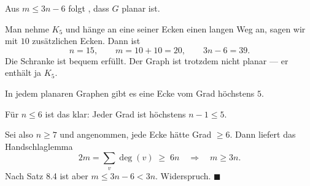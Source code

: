 \begin{merksatz}
\begin{center}
\begin{minipage}{0.88\textwidth}
\end{minipage}
\end{center}
\end{merksatz}

\begin{warnung}
Aus $m \le 3n-6$ folgt , dass $G$ planar ist.

Man nehme $K_5$ und hänge an eine seiner Ecken einen langen Weg an, sagen wir mit $10$ zusätzlichen Ecken. Dann ist
\[ n = 15, \qquad m = 10 + 10 = 20, \qquad 3n - 6 = 39 . \]
Die Schranke ist bequem erfüllt. Der Graph ist trotzdem nicht planar --- er enthält ja $K_5$.

\begin{center}
\begin{minipage}{0.88\textwidth}
\end{minipage}
\end{center}
\end{warnung}

\begin{merksatz}
In jedem planaren Graphen gibt es eine Ecke vom Grad höchstens $5$.

Für $n \le 6$ ist das klar: Jeder Grad ist höchstens $n - 1 \le 5$.

Sei also $n \ge 7$ und angenommen, jede Ecke hätte Grad $\ge 6$. Dann liefert das Handschlaglemma
\[ 2m = \sum_v \deg(v) \;\ge\; 6n \quad\Longrightarrow\quad m \ge 3n . \]
Nach Satz 8.4 ist aber $m \le 3n-6 < 3n$. Widerspruch. $\blacksquare$

\begin{center}
\begin{minipage}{0.88\textwidth}
\end{minipage}
\end{center}
\end{merksatz}


